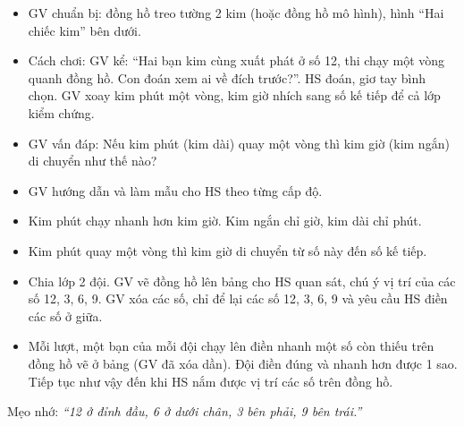 \documentclass[../main.tex]{subfiles}
\begin{document}
\begin{itemize}
    \item GV chuẩn bị: đồng hồ treo tường 2 kim (hoặc đồng hồ mô hình), hình “Hai chiếc kim” bên dưới.
    \item Cách chơi: GV kể: “Hai bạn kim cùng xuất phát ở số 12, thi chạy một vòng quanh đồng hồ. Con đoán xem ai về đích trước?”. HS đoán, giơ tay bình chọn. GV xoay kim phút một vòng, kim giờ nhích sang số kế tiếp để cả lớp kiểm chứng.
    \item GV vấn đáp: Nếu kim phút (kim dài) quay một vòng thì kim giờ (kim ngắn) di chuyển như thế nào?
    \item GV hướng dẫn và làm mẫu cho HS theo từng cấp độ.
\end{itemize}
\begin{luuy}
    \begin{itemize}
        \item Kim phút chạy nhanh hơn kim giờ. Kim ngắn chỉ giờ, kim dài chỉ phút.
        \item Kim phút quay một vòng thì kim giờ di chuyển từ số này đến số kế tiếp.
    \end{itemize}
\end{luuy}

\begin{itemize}
    \item Chia lớp 2 đội. GV vẽ đồng hồ lên bảng cho HS quan sát, chú ý vị trí của các số 12, 3, 6, 9. GV xóa các số, chỉ để lại các số 12, 3, 6, 9 và yêu cầu HS điền các số ở giữa.
    \item Mỗi lượt, một bạn của mỗi đội chạy lên điền nhanh một số còn thiếu trên đồng hồ vẽ ở bảng (GV đã xóa dần). Đội điền đúng và nhanh hơn được 1 sao. Tiếp tục như vậy đến khi HS nắm được vị trí các số trên đồng hồ.
\end{itemize}
\begin{luuy}
    Mẹo nhớ: \textit{“12 ở đỉnh đầu, 6 ở dưới chân, 3 bên phải, 9 bên trái.”}
\end{luuy}
\end{document}
